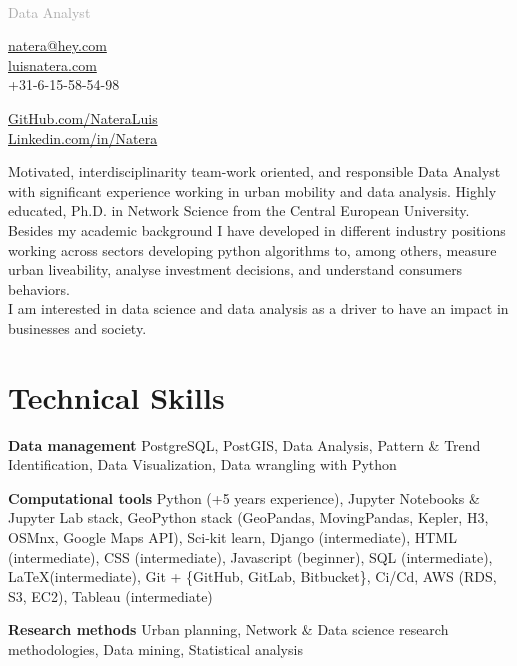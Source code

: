 \documentclass{academiccv}
\begin{document}
\raggedright

\namefont{\myname}\\
\vspace{1em}
\textcolor{darkgray}{{\Large Data Analyst}}

\vspace{1em}
\begin{minipage}[t]{0.495\textwidth}
  \href{mailto:natera@hey.com}{natera@hey.com}\\
  \href{https://luisnatera.com}{luisnatera.com} \\
  +31-6-15-58-54-98
\end{minipage}
\begin{minipage}[t]{0.495\textwidth}
	\href{https://github.com/nateraluis}{GitHub.com/NateraLuis}\\
	\href{https://www.linkedin.com/in/natera/}{Linkedin.com/in/Natera} \\
	
  \end{minipage}
\vspace{2.5em}

Motivated, interdisciplinarity team-work oriented, and responsible Data Analyst with significant experience working in urban mobility and data analysis. Highly educated, Ph.D. in Network Science from the Central European University. Besides my academic background I have developed in different industry positions working across sectors developing python algorithms to, among others, measure urban liveability, analyse investment decisions, and understand consumers behaviors.\\
I am interested in data science and data analysis as a driver to have an impact in businesses and society.

\section*{Technical Skills}
\begin{list}{}{}
	\item[\textbf{Data management}] \tab PostgreSQL, PostGIS, Data Analysis, Pattern \& Trend Identification, Data Visualization, Data wrangling with Python 
	\item[\textbf{Computational tools}] \tab Python (+5 years experience), Jupyter Notebooks \& Jupyter Lab stack, GeoPython stack (GeoPandas, MovingPandas, Kepler, H3, OSMnx, Google Maps API), Sci-kit learn, Django (intermediate), HTML (intermediate), CSS (intermediate), Javascript (beginner), SQL (intermediate), \LaTeX (intermediate), Git + \{GitHub, GitLab, Bitbucket\}, Ci/Cd, AWS (RDS, S3, EC2), Tableau (intermediate) 
	\item[\textbf{Research methods}] \tab Urban planning, Network \& Data science research methodologies, Data mining, Statistical analysis
\end{list}
\end{document}
